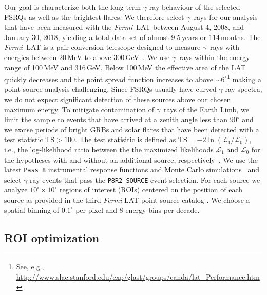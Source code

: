 \documentclass[twocolumn]{aastex62}
\newcommand{\Grays}{$\gamma$~rays\xspace}
\newcommand{\gray}{$\gamma$-ray\xspace}
\newcommand{\FermiLAT}{\emph{Fermi}~LAT\xspace}
\newcommand{\fermiLAT}{\emph{Fermi}-LAT\xspace}
\begin{document}
Our goal is characterize both the long term \gray behaviour of the selected FSRQs as well as the brightest flares.
We therefore select \Grays for our analysis that have been measured with the \FermiLAT between August 4, 2008, and January 30, 2018, yielding a total data set of almost 9.5\,years or 114\,months.
The \FermiLAT is a pair conversion telescope designed to measure \Grays with energies between 20\,MeV to above 300\,GeV~\citep{2009ApJ...697.1071A}.
We use \Grays within the energy range of 100\,MeV and 316\,GeV. 
Below 100\,MeV the effective area of the LAT quickly decreases and the point spread function increases to above $\sim 6^\circ$\footnote{See, e.g., \url{http://www.slac.stanford.edu/exp/glast/groups/canda/lat_Performance.htm}} making a point source analysis challenging. 
Since FSRQs usually have curved \gray spectra, we do not expect significant detection of these sources above our chosen maximum energy.
To mitigate contamination of \Grays of the Earth Limb, we limit the sample to events that have arrived at a zenith angle less than $90^\circ$ and we excise periods of bright GRBs and solar flares that have been detected with a test statistic $\mathrm{TS} > 100$.
The test statisitic is defined as $\mathrm{TS} = -2\ln(\mathcal{L}_1 / \mathcal{L}_0)$, i.e., the log-likelihood ratio between the the maximized likelihoods $\mathcal{L}_1$ and $\mathcal{L}_0$ for the hypotheses with and without an additional source, respectively~\citep{mattox1996}.
We use the latest \texttt{Pass 8} instrumental response functions and Monte Carlo simulations~\citep{pass8} and select \gray events that pass the \texttt{P8R2 SOURCE} event selection. 
For each source we analyze $10^\circ \times 10^\circ$ regions of interest (ROIs) centered on the position of each source as provided in the third \fermiLAT point source catalog \citep[3FGL,][]{3fgl}.
We choose a spatial binning of $0.1^\circ$ per pixel and 8 energy bins per decade. 

\subsection{ROI optimization}
\label{sec:roi}
\end{document}
